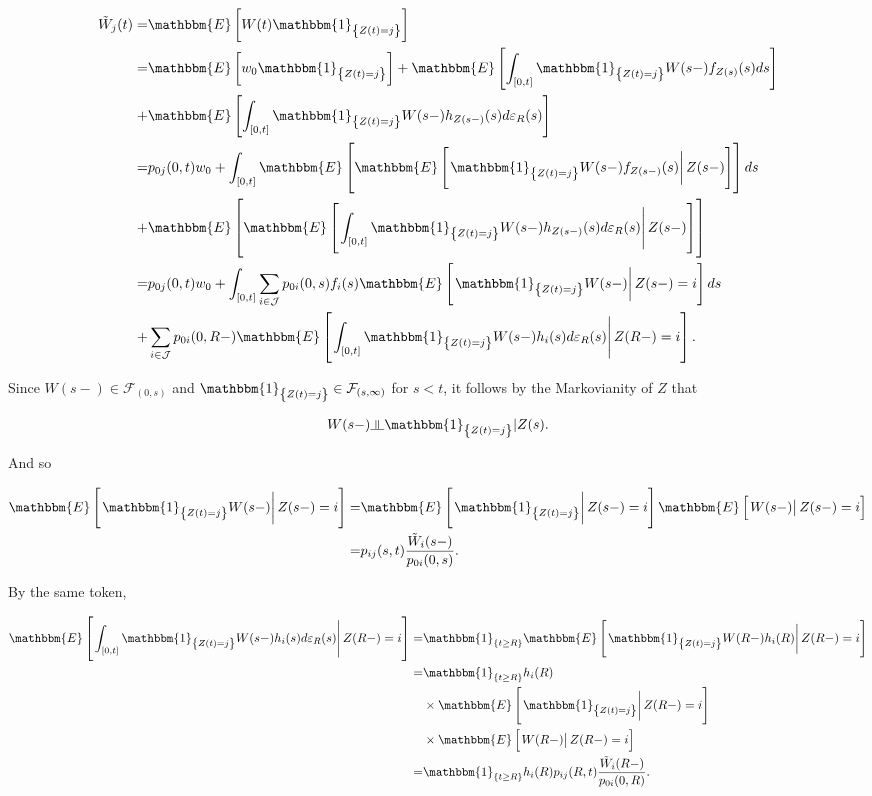 \documentclass{article}
\newcommand{\indep}{\rotatebox[origin=c]{90}{$\models$}}
\newcommand{\1}[1]{\mathbbm{1}_{\left\lbrace #1 \right\rbrace}}
\newcommand{\expec}[1][def]{\mathbbm{E} \left[ #1 \right]}
\newcommand{\econd}[2][def]{\mathbbm{E} \left[ \left. #1 \right| #2 \right]}
\theoremstyle{break}
\theoremstyle{remark}
\numberwithin{equation}{section}
\begin{document}
\begin{align} \label{SkalBruges}
	\tilde{W}_j(t) =& \expec[W(t) \1{Z(t)=j}] \nonumber \\
	=& \expec[w_0 \1{Z(t)=j}] + \expec[\int_{\left[ 0,t \right]} \1{Z(t)=j} W(s-) f_{Z(s)}(s) ds] \nonumber \\
	+& \expec[\int_{\left[ 0,t \right]} \1{Z(t)=j} W(s-) h_{Z(s-)}(s) d \varepsilon_{R}(s)] \nonumber \\
	=& p_{0j}(0,t) w_0 + \int_{\left[ 0,t \right]} \mathbbm{E} \left[ \econd[\1{Z(t)=j} W(s-) f_{Z(s-)}(s)]{Z(s-)} \right]ds \nonumber \\
	+& \mathbbm{E} \left[ \econd[ \int_{\left[ 0,t \right]} \1{Z(t)=j} W(s-) h_{Z(s-)}(s) d \varepsilon_{R}(s) ]{Z(s-)} \right] \nonumber \\
	=& p_{0j}(0,t) w_0 + \int_{\left[ 0,t \right]} \sum_{i \in \mathcal{J}} p_{0i}(0,s) f_{i}(s) \econd[\1{Z(t)=j} W(s-)]{Z(s-)=i} ds \\
	+& \sum_{i \in \mathcal{J}} p_{0i}(0,R-) \econd[\int_{\left[ 0,t \right]} \1{Z(t)=j} W(s-) h_{i}(s) d \varepsilon_{R}(s)]{Z(R-)=i}. \nonumber
\end{align}

Since $W(s-) \in  \mathcal{F}_{\left( 0,s \right)}$ and $\1{Z(t)=j} \in \mathcal{F}_{\left( s,\infty \right)}$ for $s<t$, it follows by the Markovianity of $Z$ that

\begin{align*}
	W(s-) \indep \1{Z(t)=j} | Z(s).
\end{align*}

And so 

\begin{align} \label{cba}
	\econd[\1{Z(t)=j}W(s-)]{Z(s-)=i} =& \econd[\1{Z(t)=j}]{Z(s-)=i} \econd[W(s-)]{Z(s-)=i} \nonumber \\
	=& p_{ij}(s,t) \frac{\tilde{W}_i(s-)}{p_{0i}(0,s)}.
\end{align}

By the same token,

\begin{align} \label{cba2}
	\econd[\int_{\left[ 0,t \right]} \1{Z(t)=j} W(s-) h_{i}(s) d \varepsilon_{R}(s)]{Z(R-)=i} =& \1{t \geq R} \econd[\1{Z(t)=j} W(R-) h_{i}(R)]{Z(R-)=i} \nonumber \\
	=& \1{t \geq R} h_{i}(R) \nonumber \\
	&\times \econd[\1{Z(t)=j}]{Z(R-)=i} \nonumber \\
	&\times \econd[W(R-)]{Z(R-)=i} \nonumber \\
	=& \1{t \geq R} h_{i}(R) p_{ij}(R,t) \frac{\tilde{W}_i(R-)}{p_{0i}(0,R)}.
\end{align}
\end{document}
